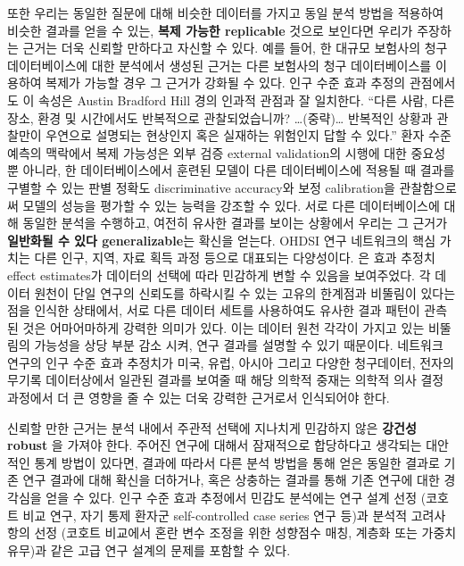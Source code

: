 \documentclass[10.5pt]{book}
\theoremstyle{definition}
\theoremstyle{definition}
\theoremstyle{definition}
\theoremstyle{remark}
\begin{document}
또한 우리는 동일한 질문에 대해 비슷한 데이터를 가지고 동일 분석 방법을
적용하여 비슷한 결과를 얻을 수 있는, \textbf{복제 가능한 replicable}
것으로 보인다면 우리가 주장하는 근거는 더욱 신뢰할 만하다고 자신할 수
있다. 예를 들어, 한 대규모 보험사의 청구 데이터베이스에 대한 분석에서
생성된 근거는 다른 보험사의 청구 데이터베이스를 이용하여 복제가 가능할
경우 그 근거가 강화될 수 있다. 인구 수준 효과 추정의 관점에서도 이
속성은 Austin Bradford Hill 경의 인과적 관점과 잘 일치한다. ``다른 사람,
다른 장소, 환경 및 시간에서도 반복적으로 관찰되었습니까?
\ldots{}(중략)\ldots{} 반복적인 상황과 관찰만이 우연으로 설명되는
현상인지 혹은 실재하는 위험인지 답할 수 있다.'' \citep{hill_1965} 환자
수준 예측의 맥락에서 복제 가능성은 외부 검증 external validation의
시행에 대한 중요성뿐 아니라, 한 데이터베이스에서 훈련된 모델이 다른
데이터베이스에 적용될 때 결과를 구별할 수 있는 판별 정확도
discriminative accuracy와 보정 calibration을 관찰함으로써 모델의 성능을
평가할 수 있는 능력을 강조할 수 있다. 서로 다른 데이터베이스에 대해
동일한 분석을 수행하고, 여전히 유사한 결과를 보이는 상황에서 우리는 그
근거가 \textbf{일반화될 수 있다 generalizable}는 확신을 얻는다. OHDSI
연구 네트워크의 핵심 가치는 다른 인구, 지역, 자료 획득 과정 등으로
대표되는 다양성이다. \citet{madigan_2013} 은 효과 추정치 effect
estimates가 데이터의 선택에 따라 민감하게 변할 수 있음을 보여주었다. 각
데이터 원천이 단일 연구의 신뢰도를 하락시킬 수 있는 고유의 한계점과
비뚤림이 있다는 점을 인식한 상태에서, 서로 다른 데이터 세트를 사용하여도
유사한 결과 패턴이 관측된 것은 어마어마하게 강력한 의미가 있다. 이는
데이터 원천 각각이 가지고 있는 비뚤림의 가능성을 상당 부분 감소 시켜,
연구 결과를 설명할 수 있기 때문이다. 네트워크 연구의 인구 수준 효과
추정치가 미국, 유럽, 아시아 그리고 다양한 청구데이터, 전자의무기록
데이터상에서 일관된 결과를 보여줄 때 해당 의학적 중재는 의학적 의사 결정
과정에서 더 큰 영향을 줄 수 있는 더욱 강력한 근거로서 인식되어야 한다.

신뢰할 만한 근거는 분석 내에서 주관적 선택에 지나치게 민감하지 않은
\textbf{강건성 robust} 을 가져야 한다. 주어진 연구에 대해서 잠재적으로
합당하다고 생각되는 대안적인 통계 방법이 있다면, 결과에 따라서 다른 분석
방법을 통해 얻은 동일한 결과로 기존 연구 결과에 대해 확신을 더하거나,
혹은 상충하는 결과를 통해 기존 연구에 대한 경각심을 얻을 수 있다.
\citep{madigan2013design} 인구 수준 효과 추정에서 민감도 분석에는 연구
설계 선정 (코호트 비교 연구, 자기 통제 환자군 self-controlled case
series 연구 등)과 분석적 고려사항의 선정 (코호트 비교에서 혼란 변수
조정을 위한 성향점수 매칭, 계층화 또는 가중치 유무)과 같은 고급 연구
설계의 문제를 포함할 수 있다.
\end{document}
